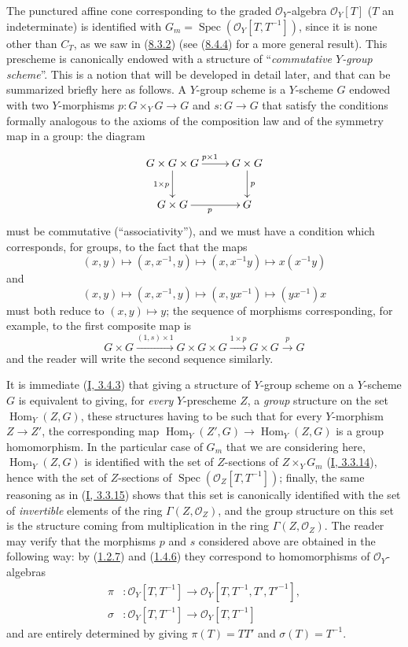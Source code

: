 \begin{remark}[8.3.9]
\label{II.8.3.9}
The punctured affine cone corresponding to the graded $\mathcal{O}_Y$-algebra
$\mathcal{O}_Y[T]$ ($T$ an indeterminate) is identified with
$G_m=\operatorname{Spec}(\mathcal{O}_Y[T,T^{-1}])$, since it is none other than
$C_T$, as we saw in (\hyperref[II.8.3.2]{8.3.2}) (see
(\hyperref[II.8.4.4]{8.4.4}) for a more general result). This prescheme
is canonically endowed with a structure of ``\emph{commutative $Y$-group
scheme}''. This is a notion that will be developed in detail later,
and that can be summarized briefly here as follows. A $Y$-group
scheme is a $Y$-scheme $G$ endowed with two $Y$-morphisms
$p:G\times_YG\to G$ and $s:G\to G$ that satisfy the conditions formally
analogous to the axioms of the composition law and of the symmetry map
in a group: the diagram
\[
  \xymatrix{
    G\times G\times G \ar[r]^{p\times1}\ar[d]_{1\times p}
      & G\times G \ar[d]^{p} \\
    G\times G \ar[r]_{p} & G
  }
\]
must be commutative (``associativity''), and we must have a condition which
corresponds, for groups, to the fact that the maps
\[
  (x,y)\mapsto(x,x^{-1},y)\mapsto(x,x^{-1}y)\mapsto x(x^{-1}y)
\]
and
\[
  (x,y)\mapsto(x,x^{-1},y)\mapsto(x,yx^{-1})\mapsto(yx^{-1})x
\]
must both reduce to $(x,y)\mapsto y$; the sequence of morphisms
corresponding, for example, to the first composite map is
\[
  G\times G\xrightarrow{(1,s)\times1}G\times G\times G
  \xrightarrow{1\times p}G\times G\xrightarrow{p}G
\]
and the reader will write the second sequence similarly.

It is immediate (\hyperref[I.3.4.3]{I, 3.4.3}) that giving a structure
of $Y$-group scheme on a $Y$-scheme $G$ is equivalent to giving, for
\emph{every} $Y$-prescheme $Z$, a \emph{group} structure on
the set $\operatorname{Hom}_Y(Z,G)$, these structures having to be such that
for every $Y$-morphism $Z\to Z'$, the corresponding map
$\operatorname{Hom}_Y(Z',G)\to\operatorname{Hom}_Y(Z,G)$ is a
group homomorphism. In the particular case of $G_m$ that we are
considering here, $\operatorname{Hom}_Y(Z,G)$ is identified with the set of
$Z$-sections of $Z\times_YG_m$ (\hyperref[I.3.3.14]{I, 3.3.14}), hence with
the set of $Z$-sections of
$\operatorname{Spec}(\mathcal{O}_Z[T,T^{-1}])$; finally, the same
reasoning as in (\hyperref[I.3.3.15]{I, 3.3.15}) shows that this
set is canonically identified with the set of \emph{invertible} elements
of the ring $\Gamma(Z,\mathcal{O}_Z)$, and the group structure on this
set is the structure coming from multiplication in the ring
$\Gamma(Z,\mathcal{O}_Z)$. The reader may verify that the morphisms $p$
and $s$ considered above are obtained in the following way: by
(\hyperref[II.1.2.7]{1.2.7}) and
(\hyperref[II.1.4.6]{1.4.6}) they correspond to homomorphisms of $\mathcal{O}_Y$-algebras
\begin{align*}
  \pi &: \mathcal{O}_Y[T,T^{-1}]
  \to\mathcal{O}_Y[T,T^{-1},T',T'^{-1}],\\
  \sigma &: \mathcal{O}_Y[T,T^{-1}]\to\mathcal{O}_Y[T,T^{-1}]
\end{align*}
and are entirely determined by giving $\pi(T)=TT'$ and
$\sigma(T)=T^{-1}$.


\end{remark}
